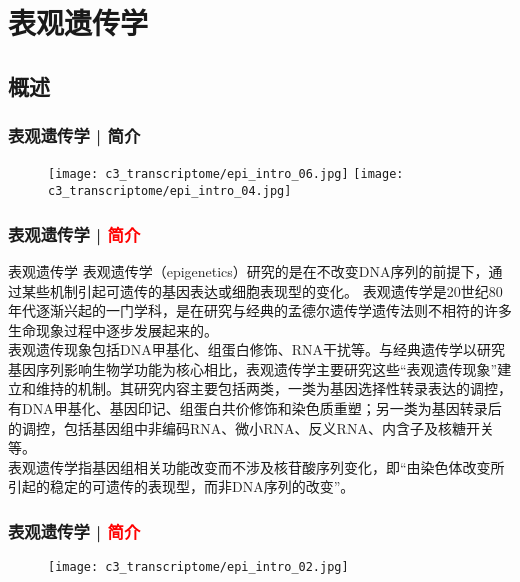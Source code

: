 \section{表观遗传学}
\subsection{概述}
\begin{frame}
  \frametitle{表观遗传学 | 简介}
  \begin{figure}
    \centering
    \texttt{[image: c3\_transcriptome/epi\_intro\_06.jpg]}
    \texttt{[image: c3\_transcriptome/epi\_intro\_04.jpg]}
  \end{figure}
\end{frame}

\begin{frame}
  \frametitle{表观遗传学 | \textcolor{red}{简介}}
  \begin{block}{表观遗传学}
表观遗传学（epigenetics）研究的是在不改变DNA序列的前提下，通过某些机制引起可遗传的基因表达或细胞表现型的变化。 表观遗传学是20世纪80年代逐渐兴起的一门学科，是在研究与经典的孟德尔遗传学遗传法则不相符的许多生命现象过程中逐步发展起来的。\\
\vspace{1em}
表观遗传现象包括DNA甲基化、组蛋白修饰、RNA干扰等。与经典遗传学以研究基因序列影响生物学功能为核心相比，表观遗传学主要研究这些“表观遗传现象”建立和维持的机制。其研究内容主要包括两类，一类为基因选择性转录表达的调控，有DNA甲基化、基因印记、组蛋白共价修饰和染色质重塑；另一类为基因转录后的调控，包括基因组中非编码RNA、微小RNA、反义RNA、内含子及核糖开关等。\\
\vspace{1em}
表观遗传学指基因组相关功能改变而不涉及核苷酸序列变化，即“由染色体改变所引起的稳定的可遗传的表现型，而非DNA序列的改变”。
  \end{block}
\end{frame}

\begin{frame}
  \frametitle{表观遗传学 | \textcolor{red}{简介}}
  \begin{figure}
    \centering
    \texttt{[image: c3\_transcriptome/epi\_intro\_02.jpg]}
  \end{figure}
\end{frame}

